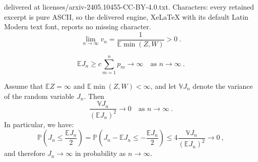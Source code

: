 \documentclass[10pt,a4paper]{amsart}
\newcommand{\E}{\mathbb{E}}
\newcommand{\PP}{\mathbb{P}}
\newcommand{\V}{\mathbb{V}}
\begin{document}
delivered at licenses/arxiv-2405.10455-CC-BY-4.0.txt. Characters: every retained excerpt is pure ASCII, so the delivered engine, XeLaTeX with its default Latin Modern text font, reports no missing character.
\begin{equation}
\lim_{n \to \infty} v_n =   \frac{1}{\E \min (Z,W)} >0~. \label{convergence vn}
\end{equation}

\begin{equation}
\E J_n \ge c \sum_{m=1}^n p_m \to \infty \quad \text{as } n\to \infty~. \label{lowerbound}
\end{equation}

\begin{lemma}\label{Lemma second moment}
Assume that $\E Z = \infty$ and $\E \min (Z,W) < \infty$, and let $\V J_n$ denote the variance of the random variable $J_n$. Then
\begin{equation}
\frac{\V J_n}{(\E J_n)^2}\to 0 \quad \text{as } n \to \infty~. \label{scnd moment method}
\end{equation}
In particular, we have:
$$\PP\left(J_n\le \frac{\E J_n}{2}\right)=\PP\left(J_n - \E J_n \le - \frac{\E J_n}{2}\right)\le 4\frac{\V J_n}{(\E J_n)^2}\to 0~,$$
and therefore $J_n \to \infty$ in probability as $n \to \infty$.
\end{lemma}
\end{document}
